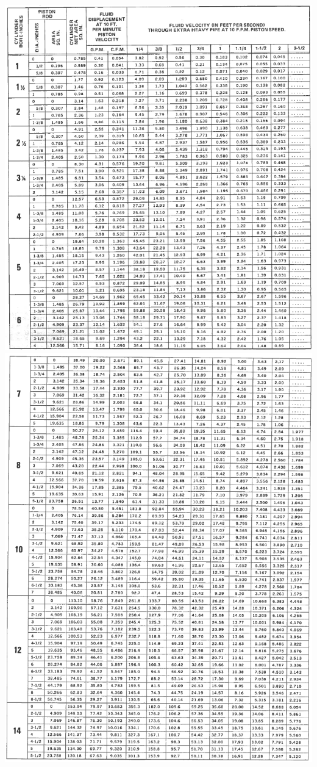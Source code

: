\documentclass[11pt, fleqn]{article}
\begin{document}
\begin{enumerate}
    \includegraphics[scale=1]{Fluids/tabB5a.png}\\
    \includegraphics[scale=1]{Fluids/tabB5b.png}


\end{enumerate}
\end{document}
